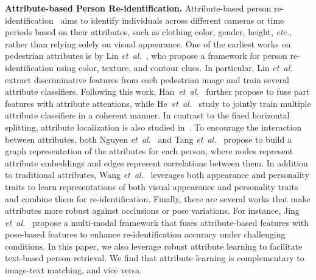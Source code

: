 \documentclass[sigconf]{acmart}
\def\etal{\emph{et~al.}}
\begin{document}
\noindent\textbf{Attribute-based Person Re-identification.}
Attribute-based person re-identification~\cite{lin2019improving, han2018attribute, ling2019improving, luo2019learning, zhang2019part, tay2019aanet, li2020attributes} aims to identify individuals across different cameras or time periods based on their attributes, such as clothing color, gender, height, \emph{etc.}, rather than relying solely on visual appearance.
One of the earliest works on pedestrian attributes is by Lin \etal~\cite{lin2019improving}, who propose a framework for person re-identification using color, texture, and contour clues. In particular, Lin \etal~ extract discriminative features from each pedestrian image and train several attribute classifiers. 
Following this work, Han~\etal~\cite{han2018attribute} further propose to fuse part features with attribute attentions, while He~\etal~\cite{he2017adaptively} study to jointly train multiple attribute classifiers in a coherent manner. 
In contrast to the fixed horizontal splitting, attribute localization is also studied in~\cite{shi2020person}.
To encourage the interaction between attributes, both Nguyen \etal~\cite{nguyen2021graph} and Tang \etal~\cite{tang2022learning} propose to build a graph representation of the attributes for each person, where nodes represent attribute embeddings and edges represent correlations between them. 
In addition to traditional attributes, Wang \etal~\cite{wang2018transferable} leverages both appearance and personality traits to learn representations of both visual appearance and personality traits and combine them for re-identification. 
Finally, there are several works that make attributes more robust against occlusions or pose variations. 
For instance, Jing \etal~\cite{jing2020pose} propose a multi-modal framework that fuses attribute-based features with pose-based features to enhance re-identification accuracy under challenging conditions. 
In this paper, we also leverage robust attribute learning to facilitate text-based person retrieval. We find that attribute learning is complementary to image-text matching, and vice versa. 
\end{document}
